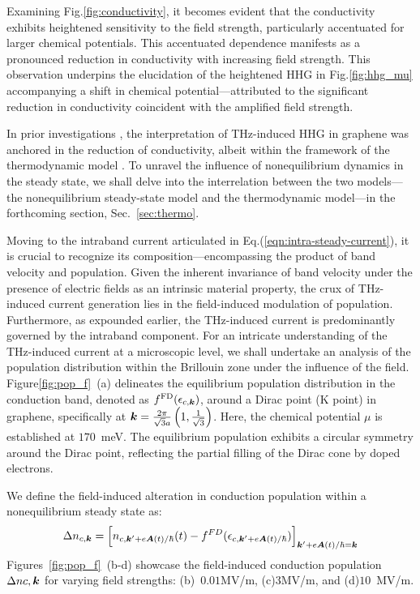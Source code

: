 Examining Fig.\ref{fig:conductivity}, it becomes evident that the conductivity exhibits heightened sensitivity to the field strength, particularly accentuated for larger chemical potentials. This accentuated dependence manifests as a pronounced reduction in conductivity with increasing field strength. This observation underpins the elucidation of the heightened HHG in Fig.\ref{fig:hhg_mu} accompanying a shift in chemical potential—attributed to the significant reduction in conductivity coincident with the amplified field strength.

In prior investigations \cite{hafez2018extremely,kovalev2021electrical}, the interpretation of THz-induced HHG in graphene was anchored in the reduction of conductivity, albeit within the framework of the thermodynamic model \cite{mics2015thermodynamic}. To unravel the influence of nonequilibrium dynamics in the steady state, we shall delve into the interrelation between the two models—the nonequilibrium steady-state model and the thermodynamic model—in the forthcoming section, Sec.~\ref{sec:thermo}.

Moving to the intraband current articulated in Eq.(\ref{eqn:intra-steady-current}), it is crucial to recognize its composition—encompassing the product of band velocity and population. Given the inherent invariance of band velocity under the presence of electric fields as an intrinsic material property, the crux of THz-induced current generation lies in the field-induced modulation of population. Furthermore, as expounded earlier, the THz-induced current is predominantly governed by the intraband component. For an intricate understanding of the THz-induced current at a microscopic level, we shall undertake an analysis of the population distribution within the Brillouin zone under the influence of the field. Figure\ref{fig:pop_f}~(a) delineates the equilibrium population distribution in the conduction band, denoted as $f^{\mathrm{FD}}(\epsilon_{c,\boldsymbol k})$, around a Dirac point (K point) in graphene, specifically at $\boldsymbol k =\frac{2\pi}{\sqrt{3}a}\left(1, \frac{1}{\sqrt{3}}\right)$. Here, the chemical potential $\mu$ is established at $170$~meV. The equilibrium population exhibits a circular symmetry around the Dirac point, reflecting the partial filling of the Dirac cone by doped electrons.

We define the field-induced alteration in conduction population within a nonequilibrium steady
state as:
\begin{align}
    \Delta n_{c,\boldsymbol{k}}= \left [n_{c, \boldsymbol{k}'+e\boldsymbol{A}(t)/\hbar}(t)- f^{FD}(\epsilon_{c,\boldsymbol{k}'+e\boldsymbol A (t)/\hbar})\right ]_{\boldsymbol k'+e\boldsymbol A(t)/\hbar =\boldsymbol k}
\end{align}
Figures~\ref{fig:pop_f}~(b-d) showcase the field-induced conduction population $\Delta n{c,\boldsymbol{k}}$ for varying field strengths: (b)~$0.01$MV/m, (c)$3$MV/m, and (d)$10$~MV/m.

